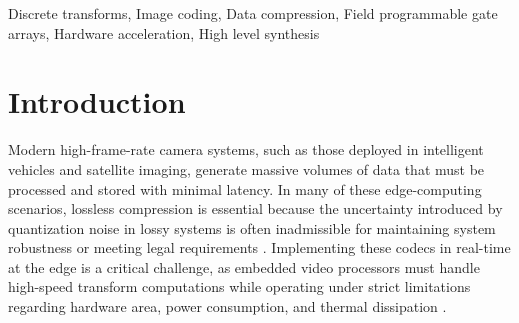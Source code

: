 \documentclass[conference]{IEEEtran}
\begin{document}
\begin{abstract}
This work presents forward and inverse hardware kernels for an integer and
reversible Walsh--Hadamard Transform used as a decorrelation stage in lossless
image compression. The lifting architecture relies on additions, subtractions,
and arithmetic shifts, which avoids multipliers while preserving exact
reconstruction. The synthesizable C++ functions matched a bit-accurate reference
model in 100,001 cases per direction, and the combined forward--inverse path
reconstructed 400,001 input blocks without error. C/RTL cosimulation passed for
the integrated and isolated kernels. In a controlled post-route comparison on an
AMD Kria KV260, the multiplier-free forward datapath used 501 LUTs, 424
flip-flops, no DSP blocks, and 1.5 BRAM tiles; the multiplier-based design used
500 LUTs, 377 flip-flops, 11 DSP blocks, and the same BRAM allocation. The
fastest tested constraints that closed timing were 250~MHz and 285.71~MHz,
respectively. Entropy experiments reduced the per-band entropy of spatially
correlated natural-like data by approximately 20\%. These results show that the
proposed transform removes DSP use with almost unchanged LUT cost, while trading
some register count and operating frequency.
\end{abstract}

\begin{IEEEkeywords}
Discrete transforms, Image coding, Data compression, Field programmable gate
arrays, Hardware acceleration, High level synthesis
\end{IEEEkeywords}

\section{Introduction}

Modern high-frame-rate camera systems, such as those deployed in intelligent vehicles and satellite imaging, generate massive volumes of data that must be processed and stored with minimal latency. In many of these edge-computing scenarios, lossless compression is essential because the uncertainty introduced by quantization noise in lossy systems is often inadmissible for maintaining system robustness or meeting legal requirements \cite{alonso2021}. Implementing these codecs in real-time at the edge is a critical challenge, as embedded video processors must handle high-speed transform computations while operating under strict limitations regarding hardware area, power consumption, and thermal dissipation \cite{amira2007}.
\end{document}
